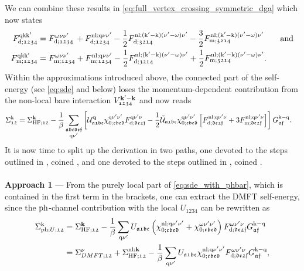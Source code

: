 \documentclass[../../main.tex]{subfiles}
\begin{document}
We can combine these results in \eqref{eq:full_vertex_crossing_symmetric_dga} which now states
\begin{subequations}
\begin{align}
	F^{\text{q}\text{k}\text{k}'}_{\text{d};\mathfrak{1234}}&=F^{\omega\nu\nu'}_{\text{d};\mathfrak{1234}}\,+F^{\text{nl};\text{q}\nu\nu'}_{\text{d};\mathfrak{1234}}-\frac12 F_{\text{d};\mathfrak{3214}}^{\text{nl};(\text{k}'-\text{k})(\nu'-\omega)\nu'}-\frac32 F_{\text{m};\mathfrak{3214}}^{\text{nl};(\text{k}'-\text{k})(\nu'-\omega)\nu'}\qquad\text{and}\\
	F^{\text{q}\text{k}\text{k}'}_{\text{m};\mathfrak{1234}}&=F^{\omega\nu\nu'}_{\text{m};\mathfrak{1234}}+F^{\text{nl};\text{q}\nu\nu'}_{\text{m};\mathfrak{1234}}-\frac12 F_{\text{d};\mathfrak{3214}}^{\text{nl};(\text{k}'-\text{k})(\nu'-\omega)\nu'}+\frac12 F_{\text{m};\mathfrak{3214}}^{\text{nl};(\text{k}'-\text{k})(\nu'-\omega)\nu'}.
\end{align}
\end{subequations}
Within the approximations introduced above, the connected part of the self-energy (see \eqref{eq:sde} and below) loses the momentum-dependent contribution from the non-local bare interaction $V^{\textbf{k}'-\textbf{k}}_{\mathfrak{1234}}$ and now reads
\begin{align}\label{eq:sde_with_phbar}
	\Sigma^{\text{k}}_{\mathfrak{12}}&=\Sigma_{\text{HF};\mathfrak{12}}^{\textbf{k}} -\frac1\beta\sum_{\substack{\mathfrak{abcdef}\\\text{q}\nu'}}\left [\mathcal{U}^{\textbf{q}}_{\mathfrak{a1bc}}\chi^{\text{q}\nu'\nu'}_{0;\mathfrak{cbed}} F^{\text{q}\nu'\nu}_{\text{d};\mathfrak{de2f}}-\frac12\tilde{\mathcal{U}}_{\mathfrak{a1bc}}\chi^{\text{q}\nu'\nu'}_{0;\mathfrak{cbed}}\left [F^{\text{nl};\text{q}\nu'\nu}_{\text{d};\mathfrak{de2f}}+3 F^{\text{nl};\text{q}\nu'\nu}_{\text{m};\mathfrak{de2f}}\right ]\right ]G_{\mathfrak{af}}^{\text{k}-\text{q}}.
\end{align}
It is now time to split up the derivation in two paths, one devoted to the steps outlined in \cite{ab initio dga}, coined , and one devoted to the steps outlined in \cite{paul worm phd}, coined .
\\\\
\textbf{Approach 1} --- From the purely local part of \eqref{eq:sde_with_phbar}, which is contained in the first term in the brackets, one can extract the DMFT self-energy, since the $\text{ph}$-channel contribution with the local $U_{\mathfrak{1234}}$ can be rewritten as
\begin{align}
	\Sigma_{\text{ph};U;\mathfrak{12}}^{\text{k}}&=\Sigma_{\text{HF};\mathfrak{12}}^{\textbf{k}}-\frac{1}{\beta}\sum_{\text{q}\nu'}U_{\mathfrak{a1bc}}\left (\chi^{\text{nl};\text{q}\nu'\nu'}_{0;\mathfrak{cbed}}+\chi^{\omega\nu'\nu'}_{0;\mathfrak{cbed}}\right ) F^{\omega\nu'\nu}_{\text{d};\mathfrak{de2f}} G_{\mathfrak{af}}^{\text{k}-\text{q}}\\
	&=\Sigma_{DMFT;\mathfrak{12}}^{\nu}+\Sigma_{\text{HF};\mathfrak{12}}^{\text{nl};\textbf{k}}-\frac{1}{\beta}\sum_{\text{q}\nu'}U_{\mathfrak{a1bc}}\chi^{\text{nl};\text{q}\nu'\nu'}_{0;\mathfrak{cbed}}F^{\omega\nu'\nu}_{\text{d};\mathfrak{de2f}} G_{\mathfrak{af}}^{\text{k}-\text{q}},
\end{align}
\end{document}
